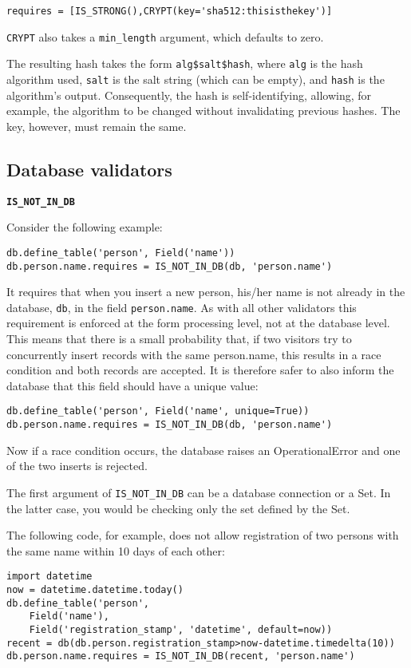 \documentclass[justified,sixbynine,notoc]{tufte-book}
\def\ft{\small\tt}
\def\inxx#1{\index{#1}}
\begin{document}
\begin{fullwidth}
\begin{lstlisting}
requires = [IS_STRONG(),CRYPT(key='sha512:thisisthekey')]
\end{lstlisting}

{\ft CRYPT} also takes a {\ft min\_length} argument, which defaults to zero.

The resulting hash takes the form {\ft alg\$salt\$hash}, where {\ft alg} is the hash algorithm used, {\ft salt} is the salt string (which can be empty), and {\ft hash} is the algorithm's output. Consequently, the hash is self-identifying, allowing, for example, the algorithm to be changed without invalidating previous hashes. The key, however, must remain the same.

\goodbreak\subsection{Database validators}

{\bf {\ft IS\_NOT\_IN\_DB}}

\inxx{IS\_NOT\_IN\_DB}

Consider the following example:
\begin{lstlisting}
db.define_table('person', Field('name'))
db.person.name.requires = IS_NOT_IN_DB(db, 'person.name')
\end{lstlisting}

It requires that when you insert a new person, his/her name is not already in the database, {\ft db}, in the field {\ft person.name}. As with all other validators this requirement is enforced at the form processing level, not at the database level. This means that there is a small probability that, if two visitors try to concurrently insert records with the same person.name, this results in a race condition and both records are accepted. It is therefore safer to also inform the database that this field should have a unique value:
\begin{lstlisting}
db.define_table('person', Field('name', unique=True))
db.person.name.requires = IS_NOT_IN_DB(db, 'person.name')
\end{lstlisting}

Now if a race condition occurs, the database raises an OperationalError and one of the two inserts is rejected.

The first argument of {\ft IS\_NOT\_IN\_DB} can be a database connection or a Set. In the latter case, you would be checking only the set defined by the Set.

The following code, for example, does not allow registration of two persons with the same name within 10 days of each other:
\begin{lstlisting}
import datetime
now = datetime.datetime.today()
db.define_table('person',
    Field('name'),
    Field('registration_stamp', 'datetime', default=now))
recent = db(db.person.registration_stamp>now-datetime.timedelta(10))
db.person.name.requires = IS_NOT_IN_DB(recent, 'person.name')
\end{lstlisting}


\end{fullwidth}
\end{document}
